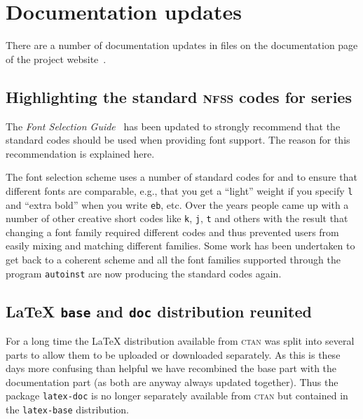 \documentclass{ltnews}
\providecommand\acro[1]{\textsc{#1}}
\providecommand\CTAN{\textsc{ctan}}
\begin{document}
\section{Documentation updates}

There are a number of
documentation updates in files 
on the documentation page of the project website~\cite{30:site-doc}.

\subsection{Highlighting the standard \acro{nfss} codes for series} 

The \emph{Font Selection Guide}~\cite{fntguide} has been
updated to strongly recommend that the standard codes should be used
when providing font support.  The reason for this recommendation is explained here.


The font selection scheme uses a number of standard codes for
 and  to ensure that different fonts are
comparable, e.g., that you get a \enquote{light} weight if you specify
\texttt{l} and \enquote{extra bold} when you write \texttt{eb},
etc. Over the years people came up with a number of other creative
short codes like \texttt{k}, \texttt{j}, \texttt{t} and others with
the result that changing a font family required different codes and
thus prevented users from easily mixing and matching different
families. 
Some work has been undertaken to get back to a coherent scheme and
all the font families supported through the program \texttt{autoinst}
are now producing the standard codes again. 


\subsection{\LaTeX{} \texttt{base} and \texttt{doc} distribution reunited}
      
For a long time the \LaTeX{} distribution available from \CTAN{} was
split into several parts to allow them to be uploaded or downloaded
separately. As this is these days more confusing than helpful we have
recombined the base part with the documentation part (as both are
anyway always updated together). Thus the package \texttt{latex-doc}
is no longer separately available from \CTAN{} but contained in the
\texttt{latex-base} distribution.
\end{document}
